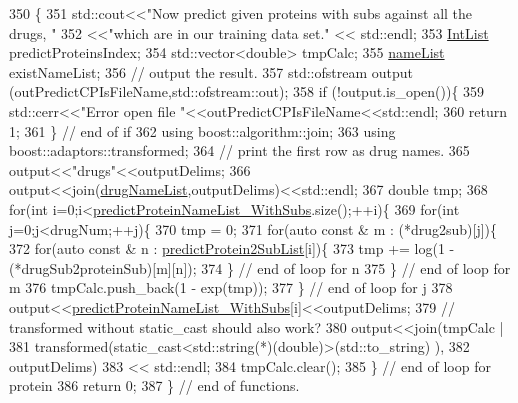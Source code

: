 \begin{DoxyCode}
350                                  \{
351     std::cout<<\textcolor{stringliteral}{"Now predict given proteins with subs against all the drugs, "}
352              <<\textcolor{stringliteral}{"which are in our training data set."} << std::endl;
353     \hyperlink{namespacegift_a786390fe70b2e3b6d61dba1014651f03}{IntList} predictProteinsIndex;
354     std::vector<double> tmpCalc;
355     \hyperlink{namespacegift_a62f85efaab3bff48335863ae0670c7a7}{nameList} existNameList;
356     \textcolor{comment}{// output the result.}
357     std::ofstream output (outPredictCPIsFileName,std::ofstream::out);
358     \textcolor{keywordflow}{if} (!output.is\_open())\{
359       std::cerr<<\textcolor{stringliteral}{"Error open file "}<<outPredictCPIsFileName<<std::endl;
360       \textcolor{keywordflow}{return} 1;
361     \} \textcolor{comment}{// end of if}
362     \textcolor{keyword}{using} boost::algorithm::join;
363     \textcolor{keyword}{using} boost::adaptors::transformed;
364     \textcolor{comment}{// print the first row as drug names.}
365     output<<\textcolor{stringliteral}{"drugs"}<<outputDelims;
366     output<<join(\hyperlink{namespacegift_a8ace6c6707676ba4866203d5ddc0a02e}{drugNameList},outputDelims)<<std::endl;
367     \textcolor{keywordtype}{double} tmp;
368     \textcolor{keywordflow}{for}(\textcolor{keywordtype}{int} i=0;i<\hyperlink{namespacegift_a03aaa96d826b6a887accc3951939ccde}{predictProteinNameList\_WithSubs}.size();++i)\{
369       \textcolor{keywordflow}{for}(\textcolor{keywordtype}{int} j=0;j<drugNum;++j)\{
370         tmp = 0;
371         \textcolor{keywordflow}{for}(\textcolor{keyword}{auto} \textcolor{keyword}{const} & m : (*drug2sub)[j])\{
372           \textcolor{keywordflow}{for}(\textcolor{keyword}{auto} \textcolor{keyword}{const} & n : \hyperlink{namespacegift_a4899f631bc8342759f4096e7b653eed8}{predictProtein2SubList}[i])\{
373             tmp += log(1 - (*drugSub2proteinSub)[m][n]);
374           \} \textcolor{comment}{// end of loop for n}
375         \} \textcolor{comment}{// end of loop for m}
376         tmpCalc.push\_back(1 - exp(tmp));
377       \} \textcolor{comment}{// end of loop for j}
378       output<<\hyperlink{namespacegift_a03aaa96d826b6a887accc3951939ccde}{predictProteinNameList\_WithSubs}[i]<<outputDelims;
379       \textcolor{comment}{// transformed without static\_cast should also work?}
380       output<<join(tmpCalc |
381               transformed(\textcolor{keyword}{static\_cast<}std::string(*)(\textcolor{keywordtype}{double})\textcolor{keyword}{>}(std::to\_string) ),
382                    outputDelims)
383             << std::endl;
384       tmpCalc.clear();
385     \} \textcolor{comment}{// end of loop for protein}
386     \textcolor{keywordflow}{return} 0;
387   \} \textcolor{comment}{// end of functions.}
\end{DoxyCode}
